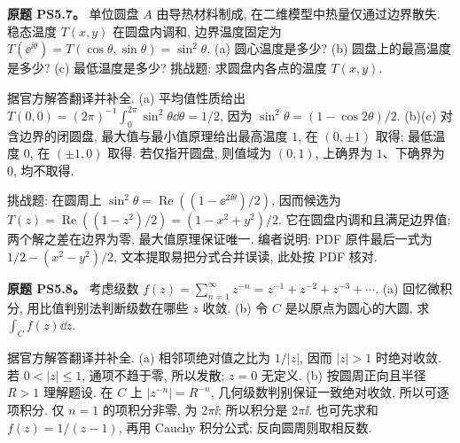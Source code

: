 \begin{exercise}
\textbf{原题 PS5.7。}\label{ass:ps5-7}
单位圆盘 $A$ 由导热材料制成, 在二维模型中热量仅通过边界散失. 稳态温度 $T(x,y)$ 在圆盘内调和, 边界温度固定为 $T(\ee^{\ii\theta})=T(\cos\theta,\sin\theta)=\sin^2\theta$.
(a) 圆心温度是多少? (b) 圆盘上的最高温度是多少? (c) 最低温度是多少?
挑战题: 求圆盘内各点的温度 $T(x,y)$.
\end{exercise}
\begin{solution}
据官方解答翻译并补全.
(a) 平均值性质给出 $T(0,0)=(2\pi)^{-1}\int_0^{2\pi}\sin^2\theta\dd\theta=1/2$, 因为 $\sin^2\theta=(1-\cos2\theta)/2$.
(b)(c) 对含边界的闭圆盘, 最大值与最小值原理给出最高温度 $1$, 在 $(0,\pm1)$ 取得; 最低温度 $0$, 在 $(\pm1,0)$ 取得. 若仅指开圆盘, 则值域为 $(0,1)$, 上确界为 $1$、下确界为 $0$, 均不取得.

挑战题: 在圆周上 $\sin^2\theta=\operatorname{Re}((1-\ee^{2\ii\theta})/2)$, 因而候选为 $T(z)=\operatorname{Re}((1-z^2)/2)=(1-x^2+y^2)/2$. 它在圆盘内调和且满足边界值; 两个解之差在边界为零, 最大值原理保证唯一. 编者说明: PDF 原件最后一式为 $1/2-(x^2-y^2)/2$, 文本提取易把分式合并误读, 此处按 PDF 核对.
\end{solution}

\begin{exercise}
\textbf{原题 PS5.8。}\label{ass:ps5-8}
考虑级数 $f(z)=\sum_{n=1}^{\infty}z^{-n}=z^{-1}+z^{-2}+z^{-3}+\cdots$.
(a) 回忆微积分, 用比值判别法判断级数在哪些 $z$ 收敛.
(b) 令 $C$ 是以原点为圆心的大圆, 求 $\int_C f(z)\dd z$.
\end{exercise}
\begin{solution}
据官方解答翻译并补全.
(a) 相邻项绝对值之比为 $1/|z|$, 因而 $|z|>1$ 时绝对收敛. 若 $0<|z|\le1$, 通项不趋于零, 所以发散; $z=0$ 无定义.
(b) 按圆周正向且半径 $R>1$ 理解题设. 在 $C$ 上 $|z^{-n}|=R^{-n}$, 几何级数判别保证一致绝对收敛, 所以可逐项积分. 仅 $n=1$ 的项积分非零, 为 $2\pi\ii$; 所以积分是 $2\pi\ii$. 也可先求和 $f(z)=1/(z-1)$, 再用 Cauchy 积分公式; 反向圆周则取相反数.
\end{solution}
